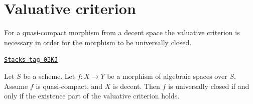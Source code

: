 \section{Valuative criterion}
\label{decent-spaces-section-valuative-criterion-universally-closed}
For a quasi-compact morphism from a decent space the valuative
criterion is necessary in order for the morphism to be
universally closed.


\begin{proposition}
\label{decent-spaces-proposition-characterize-universally-closed}
\href{https://stacks.math.columbia.edu/tag/03KJ}{\texttt{Stacks tag 03KJ}}

Let $S$ be a scheme. Let $f : X \to Y$ be a morphism of algebraic spaces
over $S$. Assume $f$ is quasi-compact, and $X$ is decent. Then $f$ is
universally closed if and only if the existence part of the valuative
criterion holds.
\end{proposition}

